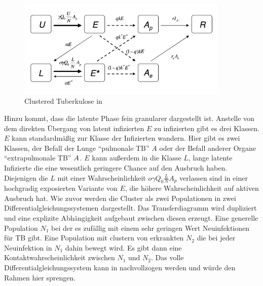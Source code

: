 \documentclass[paper=a4, fontsize=11pt, ngerman, abstract=on]{scrartcl}
\numberwithin{equation}{section} %
\numberwithin{figure}{section} %
\numberwithin{table}{section} %
\begin{document}
\begin{figure}[ht]
  \centering
  \includegraphics[width=0.9\textwidth,keepaspectratio]{images/clustered_seleir_model}
  \caption{Clustered Tuberkulose in \cite{ModellingTBEpidemics2009}}
  \label{fig:clustered-seleir}
\end{figure}

Hinzu kommt, dass die latente Phase fein granularer dargestellt ist. Anstelle von dem direkten Übergang von latent infizierten $E$ zu infizierten gibt es drei Klassen. $E$ kann standardmäßig zur Klasse der Infizierten wandern. Hier gibt es zwei Klassen, der Befall der Lunge ``pulmonale TB'' $A$ oder der Befall anderer Organe ``extrapulmonale TB'' $A^{\*}$. $E$ kann außerdem in die Klasse $L$, lange latente Infizierte die eine wesentlich geringere Chance auf den Ausbruch haben. Diejenigen die $L$ mit einer Wahrscheinlichkeit $o\gamma Q_{0}\frac{L}{N}A_{p}$ verlassen sind in einer hochgradig exposierten Variante von $E$, die höhere Wahrscheinlichkeit auf aktiven Ausbruch hat. Wie zuvor werden die Cluster als zwei Populationen in zwei Differentialgleichungssystemen dargestellt. Das Transferdiagramm wird dupliziert und eine explizite Abhängigkeit aufgebaut zwischen diesen erzeugt. Eine generelle Population $N_{1}$ bei der es zufällig mit einem sehr geringen Wert Neuinfektionen für TB gibt. Eine Population mit clustern von erkrankten $N_{2}$ die bei jeder Neuinfektion in $N_{1}$ dahin bewegt wird. Es gibt dann eine Kontaktwahrscheinlichkeit zwischen $N_{1}$ und $N_{2}$. Das volle Differentialgleichungssystem kann in \cite{ModellingTBEpidemics2009} nachvollzogen werden und würde den Rahmen hier sprengen. \\
\end{document}
